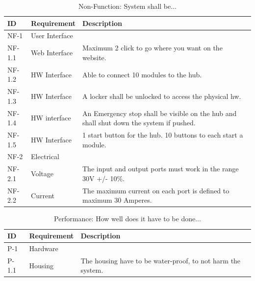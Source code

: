 \begin{table}[H]
	\begin{tabular} [b] {| p{1.2cm} |  p{3.5cm} | p{11.3cm} |}
	\hline
	\textbf{ID} & \textbf{Requirement} & \textbf{Description} \\\hline
		NF-1 & User Interface 	&  \\ \hline
		NF-1.1 & Web Interface 	& Maximum 2 click to go where you want on the website. \\ \hline
		NF-1.2 & HW Interface	& Able to connect 10 modules to the hub. \\ \hline
		NF-1.3 & HW Interface	& A locker shall be unlocked to access the physical hw. \\ \hline
		NF-1.4 & HW interface	& An Emergency stop shall be visible on the hub and shall shut down the system if pushed. \\ \hline
		NF-1.5 & HW Interface	& 1 start button for the hub. 10 buttons to each start a module. \\ \hline
		NF-2 & Electrical 		&  \\ \hline
		NF-2.1 & Voltage 		& The input and output ports must work in the range 30V +/-  10\%.\\ \hline
		NF-2.2 & Current 		& The maximum current on each port is defined to maximum 30 Amperes. \\ \hline
	\end{tabular}
	\caption{Non-Function: System shall be...}
\end{table}
\begin{table}[H]
	\begin{tabular} [b] {| p{1.2cm} |  p{3.5cm} | p{11.3cm} |}
	\hline
		\textbf{ID} & \textbf{Requirement} & \textbf{Description} \\\hline
		P-1 & Hardware 		&  \\ \hline
		P-1.1 & Housing 		& The housing have to be water-proof, to not harm the system.\\ \hline
	\end{tabular}
	\caption{Performance: How well does it have to be done...}
\end{table}
